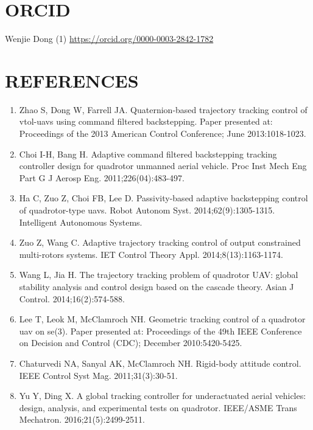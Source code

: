 \documentclass[10pt]{article}
\begin{document}
\section{ORCID}
Wenjie Dong (1) \href{https://orcid.org/0000-0003-2842-1782}{https://orcid.org/0000-0003-2842-1782}

\section{REFERENCES}
\begin{enumerate}
  \item Zhao S, Dong W, Farrell JA. Quaternion-based trajectory tracking control of vtol-uavs using command filtered backstepping. Paper presented at: Proceedings of the 2013 American Control Conference; June 2013:1018-1023.

  \item Choi I-H, Bang H. Adaptive command filtered backstepping tracking controller design for quadrotor unmanned aerial vehicle. Proc Inst Mech Eng Part G J Aerosp Eng. 2011;226(04):483-497.

  \item Ha C, Zuo Z, Choi FB, Lee D. Passivity-based adaptive backstepping control of quadrotor-type uavs. Robot Autonom Syst. 2014;62(9):1305-1315. Intelligent Autonomous Systems.

  \item Zuo Z, Wang C. Adaptive trajectory tracking control of output constrained multi-rotors systems. IET Control Theory Appl. 2014;8(13):1163-1174.

  \item Wang L, Jia $\mathrm{H}$. The trajectory tracking problem of quadrotor UAV: global stability analysis and control design based on the cascade theory. Asian J Control. 2014;16(2):574-588.

  \item Lee T, Leok M, McClamroch NH. Geometric tracking control of a quadrotor uav on se(3). Paper presented at: Proceedings of the 49th IEEE Conference on Decision and Control (CDC); December 2010:5420-5425.

  \item Chaturvedi NA, Sanyal AK, McClamroch NH. Rigid-body attitude control. IEEE Control Syst Mag. 2011;31(3):30-51.

  \item Yu Y, Ding X. A global tracking controller for underactuated aerial vehicles: design, analysis, and experimental tests on quadrotor. IEEE/ASME Trans Mechatron. 2016;21(5):2499-2511.


\end{enumerate}
\end{document}
